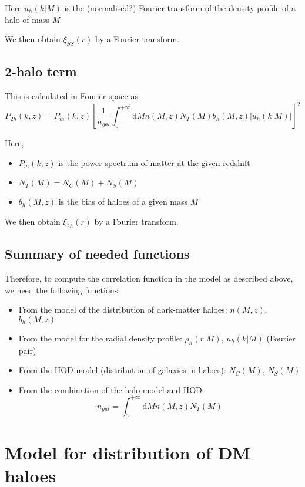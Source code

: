 \documentclass[10pt,a4paper]{article}
\begin{document}
Here $u_h(k|M)$ is the (normalised?) Fourier transform of the density profile of a halo of mass $M$

We then obtain $\xi_{SS}(r)$ by a Fourier transform.

\subsection{2-halo term}

This is calculated in Fourier space as
\begin{equation}
P_{2h}(k,z) = P_m(k,z)\left[ \frac{1}{n_{gal}} \int_0^{+\infty} \mathrm{d}M n(M,z) N_T(M) b_h(M,z) \left| u_h(k|M)\right| \right]^2
\end{equation}

Here,
\begin{itemize}
\item $P_m(k,z)$ is the power spectrum of matter at the given redshift
\item $N_T(M) = N_C(M) + N_S(M)$
\item $b_h(M,z)$ is the bias of haloes of a given mass $M$
\end{itemize}

We then obtain $\xi_{2h}(r)$ by a Fourier transform.

\subsection{Summary of needed functions}

Therefore, to compute the correlation function in the model as described above, we need the following functions:

\begin{itemize}
\item From the model of the distribution of dark-matter haloes: $n(M,z)$, $b_h(M,z)$
\item From the model for the radial density profile: $\rho_h(r|M)$, $u_h(k|M)$ (Fourier pair)
\item From the HOD model (distribution of galaxies in haloes): $N_C(M)$, $N_S(M)$
\item From the combination of the halo model and HOD:
\begin{equation}
n_{gal} = \int_0^{+\infty} \mathrm{d}M n(M,z) N_T(M)
\end{equation}
\end{itemize}



\section{Model for distribution of DM haloes}
\end{document}
